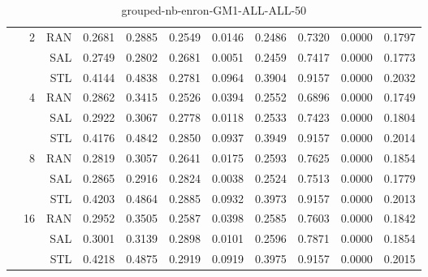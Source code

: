 \begin{center}
\begin{table}[htbp]
\begin{center}
\begin{tabular}{ | r | r | r | r | r | r | r | r | r | r | r |}
 & \multirow{3}{*}{2} & RAN & 0.2681 & 0.2885 & 0.2549 & 0.0146 & 0.2486 & 0.7320 & 0.0000 & 0.1797\\ \cline{3-11}
 &   & SAL & 0.2749 & 0.2802 & 0.2681 & 0.0051 & 0.2459 & 0.7417 & 0.0000 & 0.1773\\ \cline{3-11}
 &   & STL & 0.4144 & 0.4838 & 0.2781 & 0.0964 & 0.3904 & 0.9157 & 0.0000 & 0.2032\\ \cline{2-11}
 & \multirow{3}{*}{4} & RAN & 0.2862 & 0.3415 & 0.2526 & 0.0394 & 0.2552 & 0.6896 & 0.0000 & 0.1749\\ \cline{3-11}
 &   & SAL & 0.2922 & 0.3067 & 0.2778 & 0.0118 & 0.2533 & 0.7423 & 0.0000 & 0.1804\\ \cline{3-11}
 &   & STL & 0.4176 & 0.4842 & 0.2850 & 0.0937 & 0.3949 & 0.9157 & 0.0000 & 0.2014\\ \cline{2-11}
 & \multirow{3}{*}{8} & RAN & 0.2819 & 0.3057 & 0.2641 & 0.0175 & 0.2593 & 0.7625 & 0.0000 & 0.1854\\ \cline{3-11}
 &   & SAL & 0.2865 & 0.2916 & 0.2824 & 0.0038 & 0.2524 & 0.7513 & 0.0000 & 0.1779\\ \cline{3-11}
 &   & STL & 0.4203 & 0.4864 & 0.2885 & 0.0932 & 0.3973 & 0.9157 & 0.0000 & 0.2013\\ \cline{2-11}
 & \multirow{3}{*}{16} & RAN & 0.2952 & 0.3505 & 0.2587 & 0.0398 & 0.2585 & 0.7603 & 0.0000 & 0.1842\\ \cline{3-11}
 &   & SAL & 0.3001 & 0.3139 & 0.2898 & 0.0101 & 0.2596 & 0.7871 & 0.0000 & 0.1854\\ \cline{3-11}
 &   & STL & 0.4218 & 0.4875 & 0.2919 & 0.0919 & 0.3975 & 0.9157 & 0.0000 & 0.2015\\ \cline{2-11}
\hline
\end{tabular}
\caption{grouped-nb-enron-GM1-ALL-ALL-50}
\end{center}
 \end{table}
\end{center}

